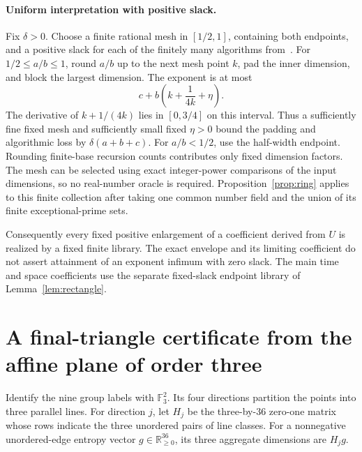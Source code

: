 \paragraph{Uniform interpretation with positive slack.}
Fix $\delta>0$. Choose a finite rational mesh in $[1/2,1]$, containing
both endpoints, and a positive slack for each of the finitely many
algorithms from~\cite{uznanski}. For $1/2\le a/b\le1$, round $a/b$
up to the next mesh point $k$, pad the inner dimension, and block the
largest dimension. The exponent is at most
\[
 c+b\left(k+\frac1{4k}+\eta\right).
\]
The derivative of $k+1/(4k)$ lies in $[0,3/4]$ on this interval.
Thus a sufficiently fine fixed mesh and sufficiently small fixed
$\eta>0$ bound the padding and algorithmic loss by
$\delta(a+b+c)$. For $a/b<1/2$, use the half-width endpoint. Rounding
finite-base recursion counts contributes only fixed dimension factors.
The mesh can be selected using exact integer-power comparisons of the
input dimensions, so no real-number oracle is required. Proposition~\ref{prop:ring}
applies to this finite collection after taking one common number field
and the union of its finite exceptional-prime sets.

Consequently every fixed positive enlargement of a coefficient derived
from $U$ is realized by a fixed finite library. The exact envelope and its
limiting coefficient do not assert attainment of an exponent infimum
with zero slack. The main time and space coefficients use the separate
fixed-slack endpoint library of Lemma~\ref{lem:rectangle}.

\section{A final-triangle certificate from the affine plane of order three}

Identify the nine group labels with $\mathbb F_3^2$. Its four directions
partition the points into three parallel lines. For direction $j$, let
$H_j$ be the three-by-36 zero-one matrix whose rows indicate the three
unordered pairs of line classes. For a nonnegative unordered-edge entropy
vector $g\in\mathbb R_{\ge0}^{36}$, its three aggregate dimensions are
$H_jg$.

